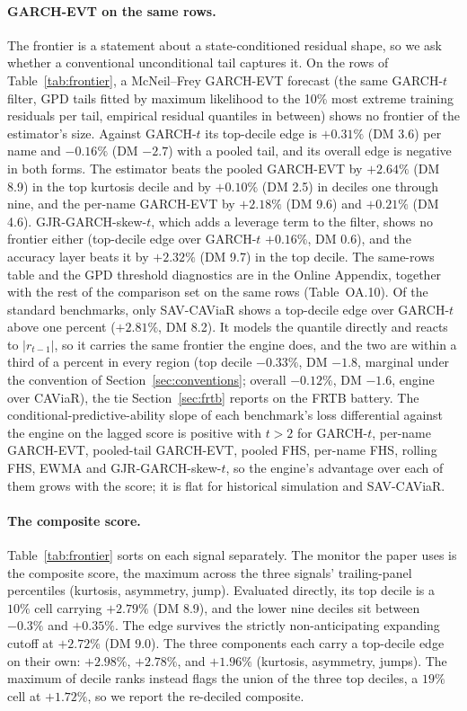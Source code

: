 \documentclass[11pt]{article}
\theoremstyle{remark}
\begin{document}
\paragraph{GARCH-EVT on the same rows.} The frontier is a statement about a state-conditioned residual shape, so we ask whether a conventional unconditional tail captures it. On the rows of Table~\ref{tab:frontier}, a McNeil--Frey GARCH-EVT forecast (the same GARCH-$t$ filter, GPD tails fitted by maximum likelihood to the 10\% most extreme training residuals per tail, empirical residual quantiles in between) shows no frontier of the estimator's size. Against GARCH-$t$ its top-decile edge is $+0.31\%$ (DM 3.6) per name and $-0.16\%$ (DM $-2.7$) with a pooled tail, and its overall edge is negative in both forms. The estimator beats the pooled GARCH-EVT by $+2.64\%$ (DM 8.9) in the top kurtosis decile and by $+0.10\%$ (DM 2.5) in deciles one through nine, and the per-name GARCH-EVT by $+2.18\%$ (DM 9.6) and $+0.21\%$ (DM 4.6). GJR-GARCH-skew-$t$, which adds a leverage term to the filter, shows no frontier either (top-decile edge over GARCH-$t$ $+0.16\%$, DM 0.6), and the accuracy layer beats it by $+2.32\%$ (DM 9.7) in the top decile. The same-rows table and the GPD threshold diagnostics are in the Online Appendix, together with the rest of the comparison set on the same rows (Table~OA.10). Of the standard benchmarks, only SAV-CAViaR shows a top-decile edge over GARCH-$t$ above one percent ($+2.81\%$, DM 8.2). It models the quantile directly and reacts to $|r_{t-1}|$, so it carries the same frontier the engine does, and the two are within a third of a percent in every region (top decile $-0.33\%$, DM $-1.8$, marginal under the convention of Section~\ref{sec:conventions}; overall $-0.12\%$, DM $-1.6$, engine over CAViaR), the tie Section~\ref{sec:frtb} reports on the FRTB battery. The conditional-predictive-ability slope of each benchmark's loss differential against the engine on the lagged score is positive with $t>2$ for GARCH-$t$, per-name GARCH-EVT, pooled-tail GARCH-EVT, pooled FHS, per-name FHS, rolling FHS, EWMA and GJR-GARCH-skew-$t$, so the engine's advantage over each of them grows with the score; it is flat for historical simulation and SAV-CAViaR.

\paragraph{The composite score.} Table~\ref{tab:frontier} sorts on each
signal separately. The monitor the paper uses is the composite
score, the maximum across the three signals' trailing-panel
percentiles (kurtosis, asymmetry, jump). Evaluated directly, its top
decile is a $10\%$ cell carrying $+2.79\%$ (DM 8.9), and the lower nine
deciles sit between $-0.3\%$ and $+0.35\%$. The edge survives the
strictly non-anticipating expanding cutoff at $+2.72\%$ (DM 9.0). The three components each carry a top-decile edge on their own: $+2.98\%$, $+2.78\%$, and $+1.96\%$ (kurtosis, asymmetry, jumps). The maximum of decile ranks instead flags the union of the three top deciles, a $19\%$ cell at $+1.72\%$, so we report the re-deciled composite.
\end{document}
